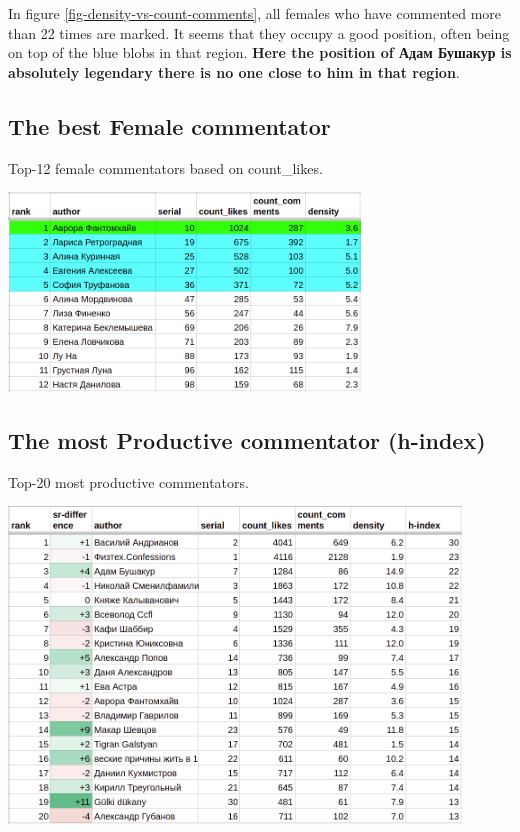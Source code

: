 \documentclass[
	12pt
] {article}
\begin{document}
	In figure \ref{fig-density-vs-count-comments}, all females who have commented more than 22 times are marked. It seems that they occupy a good position, often being on top of the blue blobs in that region. \textbf{Here the position of Адам Бушакур is absolutely legendary there is no one close to him in that region}.

\subsection{The best Female commentator}
	\begin{table}[H]
		\centering
		\caption{Top-12 female commentators based on count\_likes.}
		\label{table-female}
		\includegraphics[width=0.7\textwidth]{table-female}
	\end{table}
	
\subsection{The most Productive commentator (h-index)}
	\begin{table}[H]
		\centering
		\caption{Top-20 most productive commentators.}
		\label{table-hindex}
		\includegraphics[width=0.9\textwidth]{table-hindex}
	\end{table}
	
\end{document}
